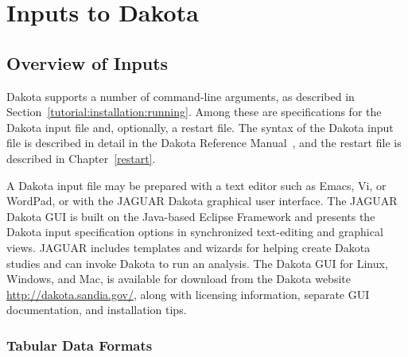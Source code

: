 \chapter{Inputs to Dakota}\label{input}

\section{Overview of Inputs}\label{input:overview}

Dakota supports a number of command-line arguments, as described in
Section~\ref{tutorial:installation:running}.  Among these are
specifications for the Dakota input file and, optionally, a restart
file.  The syntax of the Dakota input file is described in detail in
the Dakota Reference Manual~\cite{RefMan}, and the restart file is
described in Chapter~\ref{restart}.

A Dakota input file may be prepared with a text editor such as Emacs,
Vi, or WordPad, or with the JAGUAR Dakota graphical user interface.
The JAGUAR Dakota GUI is built on the Java-based Eclipse Framework
\cite{Eclipse} and presents the Dakota input specification options in
synchronized text-editing and graphical views.  JAGUAR includes
templates and wizards for helping create Dakota studies and can invoke
Dakota to run an analysis.  The Dakota GUI for Linux, Windows, and
Mac, is available for download from the Dakota website
\url{http://dakota.sandia.gov/}, along with licensing information,
separate GUI documentation, and installation tips.

\subsection{Tabular Data Formats}\label{input:tabularformat}


